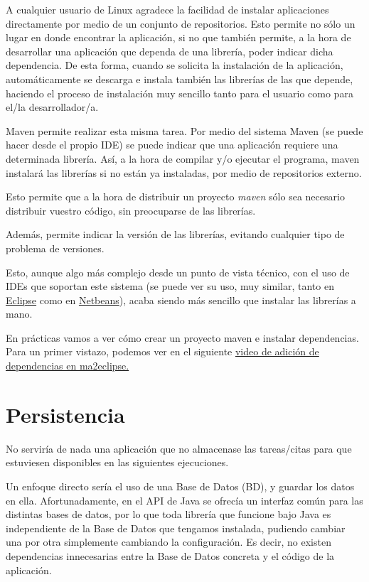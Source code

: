 \documentclass[11pt]{article}
\begin{document}
A cualquier usuario de Linux agradece la facilidad de instalar aplicaciones directamente 
por medio de un conjunto de repositorios. Esto permite no sólo un lugar en donde encontrar la aplicación, si no que
también permite, a la hora de desarrollar una aplicación que dependa de
una librería, poder indicar dicha dependencia. De esta forma, cuando se solicita la instalación de la aplicación, 
automáticamente se descarga e instala también las librerías de las que depende, haciendo el proceso de 
instalación muy sencillo tanto para el usuario como para el/la desarrollador/a. 


Maven permite realizar esta misma tarea. Por medio del sistema Maven (se puede hacer desde el propio IDE) se puede
indicar que una aplicación requiere una determinada librería. Así, a la hora de compilar y/o ejecutar el programa, 
maven instalará las librerías si no están ya instaladas, por medio de repositorios externo. 


Esto permite que a la hora de distribuir un proyecto \emph{maven} sólo sea necesario distribuir vuestro código, sin
preocuparse de las librerías.


Además, permite indicar la versión de las librerías, evitando cualquier tipo de problema de versiones.


Esto, aunque algo más complejo desde un punto de vista técnico, con el uso de IDEs que soportan este sistema 
(se puede ver su uso, muy similar, tanto en \href{http://m2eclipse.sonatype.org/adding-project-dependencies-in-m2eclipse.html}{Eclipse} como en \href{http://wiki.netbeans.org/MavenBestPractices}{Netbeans}), acaba siendo más sencillo que instalar las 
librerías a mano. 


En prácticas vamos a ver cómo crear un proyecto maven e instalar dependencias. Para un primer vistazo, podemos
ver en el siguiente \href{http://www.youtube.com/watch?v%3DH8QdjyCB8Nw}{video de adición de dependencias en ma2eclipse.}
\section{Persistencia}
\label{sec-6}
\label{librerias}




No serviría de nada una aplicación que no almacenase las tareas/citas para que estuviesen disponibles en las 
siguientes ejecuciones. 


Un enfoque directo sería el uso de una Base de Datos (BD), y guardar los datos en ella.
Afortunadamente, en el API de Java se ofrecía un interfaz común para las distintas bases de datos, por lo que
toda librería que funcione bajo Java es independiente de la Base de Datos que tengamos instalada, pudiendo 
cambiar una por otra simplemente cambiando la configuración. Es decir, no existen dependencias innecesarias
entre la Base de Datos concreta y el código de la aplicación. 
\end{document}
